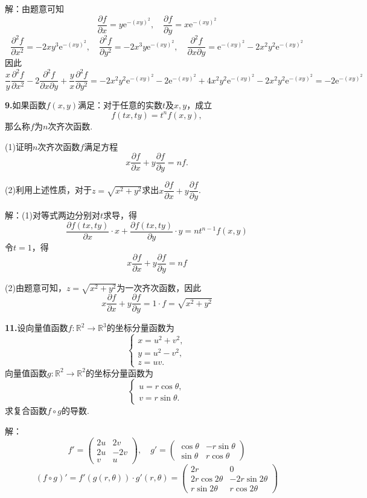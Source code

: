 \documentclass[12pt, a4paper]{article}
\newcommand{\RR}{\mathbb{R}}
\newcommand{\e}{\mathrm{e}}
\begin{document}
解：由题意可知
\[\frac{\partial f}{\partial x} = y \e^{-(xy)^2}, \quad \frac{\partial f}{\partial y} = x \e^{-(xy)^2}\]
\[\frac{\partial^2 f}{\partial x^2} = -2x y^3 \e^{-(xy)^2}, \quad \frac{\partial^2 f}{\partial y^2} = -2x^3 y \e^{-(xy)^2}, \quad \frac{\partial^2 f}{\partial x \partial y} = \e^{-(xy)^2} - 2x^2 y^2 \e^{-(xy)^2}\]
因此
\[\frac{x}{y} \frac{\partial^2 f}{\partial x^2} - 2\frac{\partial^2 f}{\partial x \partial y} + \frac{y}{x} \frac{\partial^2 f}{\partial y^2} = -2x^2 y^2 \e^{-(xy)^2} - 2\e^{-(xy)^2} + 4x^2 y^2 \e^{-(xy)^2} - 2x^2 y^2 \e^{-(xy)^2} = -2\e^{-(xy)^2}\]

\textbf{9.}如果函数\(f(x, y)\)满足：对于任意的实数\(t\)及\(x, y\)，成立
\[f(tx, ty) = t^nf(x, y),\]
那么称\(f\)为\(n\)次齐次函数.

(1)证明\(n\)次齐次函数\(f\)满足方程
\[x \frac{\partial f}{\partial x} + y \frac{\partial f}{\partial y} = n f.\]

(2)利用上述性质，对于\(z = \sqrt{x^2 + y^2}\)求出\(x \dfrac{\partial f}{\partial x} + y \dfrac{\partial f}{\partial y}\).

解：(1)对等式两边分别对\(t\)求导，得
\[\frac{\partial f(tx, ty)}{\partial x} \cdot x + \frac{\partial f(tx, ty)}{\partial y} \cdot y = n t^{n - 1} f(x, y)\]
令\(t = 1\)，得
\[x \frac{\partial f}{\partial x} + y \frac{\partial f}{\partial y} = n f\]

(2)由题意可知，\(z = \sqrt{x^2 + y^2}\)为一次齐次函数，因此
\[x \frac{\partial f}{\partial x} + y \frac{\partial f}{\partial y} = 1 \cdot f = \sqrt{x^2 + y^2}\]

\textbf{11.}设向量值函数\(f:\RR^2 \rightarrow \RR^3\)的坐标分量函数为
\[\begin{cases}
x = u^2 + v^2, \\
y = u^2 - v^2, \\
z = uv.
\end{cases}\]
向量值函数\(g:\RR^2 \rightarrow \RR^2\)的坐标分量函数为
\[\begin{cases}
u = r\cos \theta, \\
v = r\sin \theta.
\end{cases}\]
求复合函数\(f \circ g\)的导数.

解：
\[f' = \begin{pmatrix} 2u & 2v \\ 2u & -2v \\ v & u \end{pmatrix}, \quad g' = \begin{pmatrix} \cos \theta & -r \sin \theta \\ \sin \theta & r \cos \theta \end{pmatrix}\]
\[(f \circ g)' = f'(g(r, \theta)) \cdot g'(r, \theta) = \begin{pmatrix} 2r & 0 \\ 2r \cos 2\theta & -2r \sin 2\theta \\ r \sin 2\theta & r \cos 2\theta \end{pmatrix}\]
\end{document}
